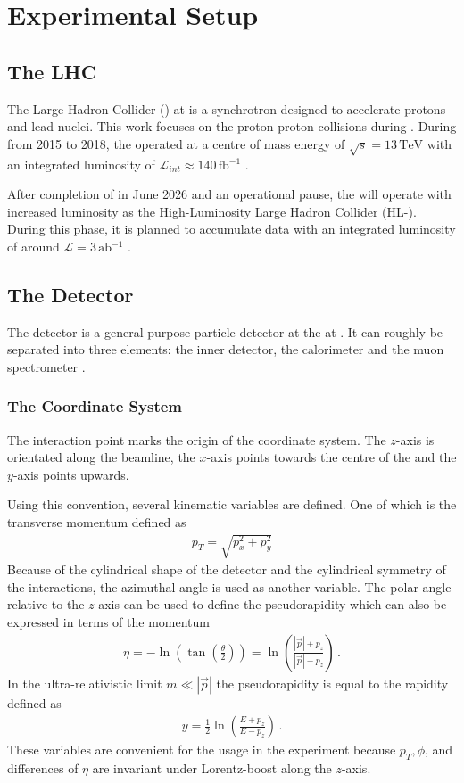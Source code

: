 \chapter{Experimental Setup}
\label{ch:exper_setup}
\section{The LHC}
The Large Hadron Collider (\lhc) at \cern is a synchrotron designed to accelerate protons and lead nuclei. This work focuses on the proton-proton collisions during \LHCrunii. During \LHCrunii from 2015 to 2018, the \lhc operated at a centre of mass energy of $\sqrt{s}=13\,\unit{\tera\electronvolt}$ with an integrated luminosity of $\mathcal{L}_{int}\approx 140\,\unit{\femto\barn^{-1}}$ \cite{ATLAS:2019pzw}.

After completion of \LHCruniii in June 2026 and an operational pause, the \lhc will operate with increased luminosity as the High-Luminosity Large Hadron Collider (HL-\lhc). During this phase, it is planned to accumulate data with an integrated luminosity of around $\mathcal{L}=3\,\unit{\atto\barn^{-1}}$ \cite{Aberle:2749422}.


\section{The Detector}
The \atlas detector is a general-purpose particle detector at the \lhc at \cern. It can roughly be separated into three elements: the inner detector, the calorimeter and the muon spectrometer \cite{atlas_tdr}.
\subsection{The Coordinate System}
The interaction point marks the origin of the \atlas coordinate system. The $z$-axis is orientated along the beamline, the $x$-axis points towards the centre of the \lhc and the $y$-axis points upwards.

Using this convention, several kinematic variables are defined. One of which is the transverse momentum defined as
\begin{align}
    p_T=\sqrt{p_x^2+p_y^2}
\end{align}
Because of the cylindrical shape of the \atlas detector and the cylindrical symmetry of the interactions, the azimuthal angle is used as another variable. The polar angle relative to the $z$-axis can be used to define the pseudorapidity which can also be expressed in terms of the momentum
\begin{align}
    \eta=-\ln\left(\tan\left(\frac{\theta}{2}\right)\right)=\ln\left(\frac{|\vec p|+p_z}{|\vec p|-p_z}\right)\,.
\end{align}
In the ultra-relativistic limit $m\ll |\vec p|$ the pseudorapidity is equal to the rapidity defined as
\begin{align}
    y=\frac{1}{2}\ln\left(\frac{E+p_z}{E-p_z}\right)\,.
\end{align}
These variables are convenient for the usage in the \atlas experiment because $p_T,\phi$, and differences of $\eta$ are invariant under Lorentz-boost along the $z$-axis.
